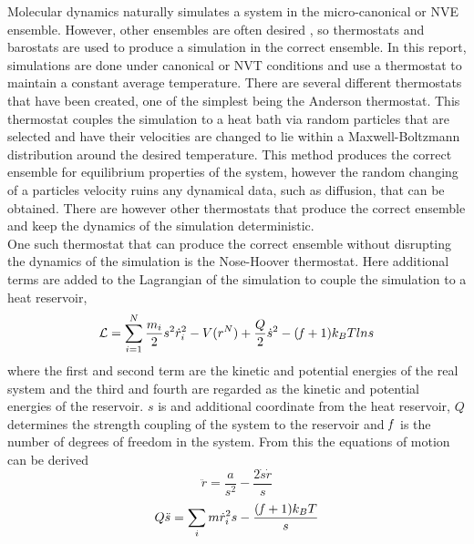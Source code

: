 \documentclass[titlepage]{article}
\begin{document}
\indent Molecular dynamics naturally simulates a system in the micro-canonical or NVE ensemble.  However, other ensembles are often desired , so thermostats and barostats are used to produce a simulation in the correct ensemble.  In this report, simulations are done under canonical or NVT conditions and use a thermostat to maintain a constant average temperature.  There are several different thermostats that have been created, one of the simplest being the Anderson thermostat.  This thermostat couples the simulation to a heat bath via random particles that are selected and have their velocities are changed to lie within a Maxwell-Boltzmann distribution around the desired temperature.  This method produces the correct ensemble for equilibrium properties of the system, however the random changing of a particles velocity ruins any dynamical data, such as diffusion, that can be obtained.  There are however other thermostats that produce the correct ensemble and keep the dynamics of the simulation deterministic.\\
\indent One such thermostat that can produce the correct ensemble without disrupting the dynamics of the simulation is the Nose-Hoover thermostat\cite{FS02, AT87}.  Here additional terms are added to the Lagrangian of the simulation to couple the simulation to a heat reservoir,
\begin{equation}
\mathcal{L}=\sum_{i=1}^{N}\frac{m_{i}}{2}s^{2}\dot{r}_{i}^{2}-V(r^{N})+\frac{Q}{2}\dot{s}^{2}-({\it f}+1)k_{B}Tlns
\label{NHlagrang}
\end{equation}
where the first and second term are the kinetic and potential energies of the real system and the third and fourth are regarded as the kinetic and potential energies of the reservoir.  $s$ is and additional coordinate from the heat reservoir, $Q$ determines the strength coupling of the system to the reservoir and ${\it f}$ is the number of degrees of freedom in the system.  From this the equations of motion can be derived
\begin{equation}
\ddot{r}=\frac{a}{s^{2}}-\frac{2\dot{s}\dot{r}}{s}
\end{equation}
\begin{equation}
Q\ddot{s}=\sum_{i}m\dot{r}_{i}^{2}s-\frac{({\it f}+1)k_{B}T}{s}
\end{equation}

\end{document}

